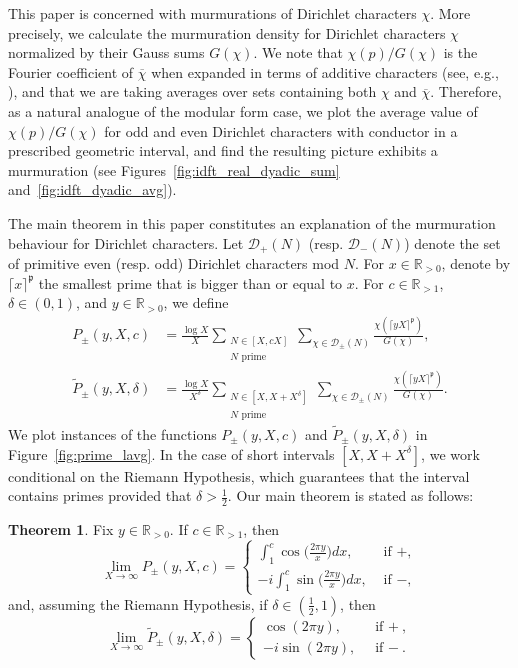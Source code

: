 \documentclass{amsart}
\theoremstyle{definition}
\newtheorem {theorem}{Theorem}[section]
\newcommand{\prceil}{\rceil^{\mathfrak p}}
\numberwithin{equation}{section}
\begin{document}
This paper is concerned with murmurations of Dirichlet characters $\chi$. More precisely, we calculate the murmuration density for Dirichlet characters $\chi$ normalized by their Gauss sums $G(\chi)$.
We note that  ${\chi}(p)/G({\chi})$ is the Fourier coefficient of $\overline{\chi}$ when expanded in terms of additive characters (see, e.g., \cite[equation~(3.12)]{IK}), and that we are taking averages over sets containing both $\chi$ and $\overline{\chi}$. Therefore, as a natural analogue of the modular form case, we plot the average value of $\chi(p)/G(\chi)$ for odd and even Dirichlet characters with conductor in a prescribed geometric interval, and find the resulting picture exhibits a {murmuration} (see Figures~\ref{fig:idft_real_dyadic_sum} and~\ref{fig:idft_dyadic_avg}). 
 
The main theorem in this paper constitutes an explanation of the murmuration behaviour for Dirichlet characters. 
Let $\mathcal{D}_{+}(N)$ (resp. $\mathcal{D}_-(N)$) denote the set of primitive even (resp. odd) Dirichlet characters mod $N$. 
For $x\in\mathbb{R}_{>0}$, denote by $\lceil x \prceil$ the smallest prime that is bigger than or equal to $x$. 
For
$c\in\mathbb{R}_{>1}$, $\delta \in (0,1)$, and $y\in\mathbb{R}_{>0}$, we define
\begin{align} 
P_\pm (y, X, c)& = \frac{\log X}{X}\sum_{\substack{N \in [X, cX] \\ N \text{ prime}}} \sum_{\chi \in \mathcal{D}_\pm(N)} \frac{\chi(\lceil yX \prceil)}{G(\chi)},  \\ 
\widetilde P_\pm (y, X, \delta)& =  \frac{\log X}{X^{\delta}}\sum_{\substack{N \in [X, X+X^\delta] \\ N \text{ prime}}} \sum_{\chi \in \mathcal{D}_\pm(N)} \frac{\chi(\lceil yX \prceil)}{G(\chi)}. \end{align}
We plot instances of the functions $P_{\pm}(y,X,c)$ and $\widetilde P_{\pm}(y,X,\delta)$ in Figure~\ref{fig:prime_lavg}.
In the case of short intervals $[X,X+X^{\delta}]$, we work conditional on the Riemann Hypothesis, which guarantees that the interval contains primes provided that $\delta>\frac12$.
Our main theorem is stated as follows:
\begin{theorem}\label{thm.main}
Fix $y\in\mathbb{R}_{>0}$.  If $c\in\mathbb{R}_{>1}$, 
then 
\begin{equation}\label{eq.Athm-1}
\lim_{X \to \infty}   P_\pm (y, X, c) = \begin{cases}
\int_1^c \cos \Big(\frac{2\pi y}{x}\Big)dx,  & \text{ if }+,\\
-i\int_1^c \sin\Big(\frac{2\pi y}{x}\Big)dx, & \text{ if }-,
\end{cases} 
\end{equation}
and, assuming the Riemann Hypothesis, if $\delta \in (\frac12,1)$, then
\begin{equation}
\label{eq.LAthm-1}
\lim_{X \to \infty} \widetilde P_\pm (y, X, \delta) = \begin{cases}
\cos(2\pi y), & \text{ if $+$},\\
-i\sin(2\pi y), & \text{ if $-$}.
\end{cases}
\end{equation}
\end{theorem}
\end{document}
